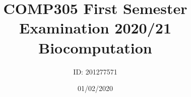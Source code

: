 \usepackage[utf8]{inputenc}
\title{
{COMP305 First Semester Examination 2020/21}\\
{\large Biocomputation}\\
}
\author{ID: 201277571}
\date{01/02/2020}
\usepackage{url}
\usepackage{float}
\usepackage{wrapfig}
\usepackage{graphicx}
\graphicspath{ {images/} }
